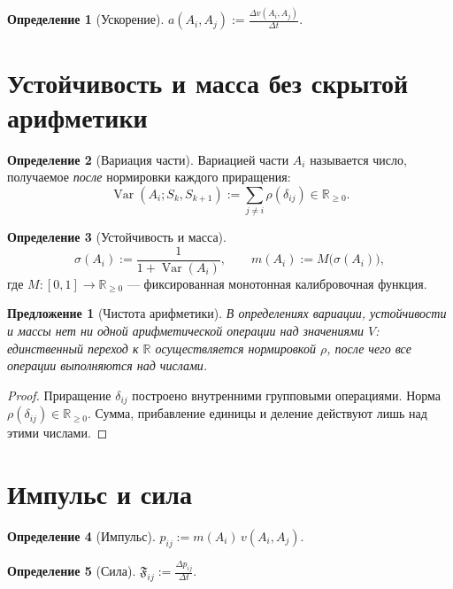 \documentclass[12pt,a4paper,oneside]{book}
\theoremstyle{definition}
\newtheorem{definition}{Определение}[chapter]
\theoremstyle{plain}
\newtheorem{proposition}{Предложение}[chapter]
\theoremstyle{remark}
\newcommand{\Values}{V}
\newcommand{\State}{S}
\newcommand{\norm}{\rho}
\newcommand{\Varr}{\operatorname{Var}}
\newcommand{\Stab}{\sigma}
\begin{document}
\begin{definition}[Ускорение]
$\displaystyle a(A_i,A_j):=\frac{\Delta v(A_i,A_j)}{\Delta t}$.
\end{definition}

\section{Устойчивость и масса без скрытой арифметики}

\begin{definition}[Вариация части]
Вариацией части $A_i$ называется число, получаемое \emph{после} нормировки каждого
приращения:
\[
\Varr(A_i;\State_k,\State_{k+1}):=\sum_{j\neq i}\norm(\delta_{ij})\in\mathbb R_{\ge0}.
\]
\end{definition}

\begin{definition}[Устойчивость и масса]
\[
\Stab(A_i):=\frac{1}{1+\Varr(A_i)},\qquad
m(A_i):=M\bigl(\Stab(A_i)\bigr),
\]
где $M:[0,1]\to\mathbb R_{\ge0}$ --- фиксированная монотонная калибровочная функция.
\end{definition}

\begin{proposition}[Чистота арифметики]
В определениях вариации, устойчивости и массы нет ни одной арифметической операции над
значениями $\Values$: единственный переход к $\mathbb R$ осуществляется нормировкой
$\norm$, после чего все операции выполняются над числами.
\end{proposition}

\begin{proof}
Приращение $\delta_{ij}$ построено внутренними групповыми операциями. Норма
$\norm(\delta_{ij})\in\mathbb R_{\ge0}$. Сумма, прибавление единицы и деление
действуют лишь над этими числами.
\end{proof}

\section{Импульс и сила}

\begin{definition}[Импульс]
$p_{ij}:=m(A_i)\,v(A_i,A_j)$.
\end{definition}

\begin{definition}[Сила]
$\displaystyle\mathfrak F_{ij}:=\frac{\Delta p_{ij}}{\Delta t}$.
\end{definition}

\end{document}
